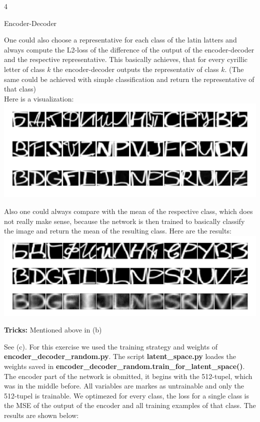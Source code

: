 \documentclass{article}
\begin{document}
\begin{ukon-infie}[28.1.18]{4}
\begin{exercise}[p=60]{Encoder-Decoder}
{		One could also choose a representative for each class of the latin latters and always compute the L2-loss of the difference of the output of the encoder-decoder and the respective representative. This basically achieves, that for every cyrillic letter of class $k$ the encoder-decoder outputs the representativ of class $k$. (The same could be achieved with simple classification and return the representative of that class)\\
		Here is a visualization:\\
		
		\includegraphics[scale=0.5]{encoder_decoder_single.png}

		
		
		Also one could always compare with the mean of the respective class, which does not really make sense, because the network is then trained to basically classify the image and return the mean of the resulting class. Here are the results:\\
		\includegraphics[scale=0.5]{decoder_encoder_mean.png}
		
		\textbf{Tricks:} Mentioned above in (b)
		
		}
		\question{}
		{
		See (c).
		}
		\question{}
		{
		For this exercise we used the training strategy and weights of \textbf{encoder\_decoder\_random.py}. The script \textbf{latent\_space.py} loades the weights saved in \textbf{encoder\_decoder\_random.train\_for\_latent\_space()}. The encoder part of the network is obmitted, it begins with the 512-tupel, which was in the middle before. All variables are markes as untrainable and only the 512-tupel is trainable. We optimezed for every class, the loss for a single class is the MSE of the output of the encoder and all training examples of that class. The results are shown below:\\
		
}
\end{exercise}
\end{ukon-infie}
\end{document}
